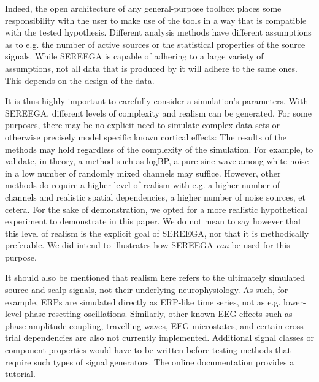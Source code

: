 Indeed, the open architecture of any general-purpose toolbox places some responsibility with the user to make use of the tools in a way that is compatible with the tested hypothesis. Different analysis methods have different assumptions as to e.g. the number of active sources or the statistical properties of the source signals. While SEREEGA is capable of adhering to a large variety of assumptions, not all data that is produced by it will adhere to the same ones. This depends on the design of the data.

It is thus highly important to carefully consider a simulation's parameters. With SEREEGA, different levels of complexity and realism can be generated. For some purposes, there may be no explicit need to simulate complex data sets or otherwise precisely model specific known cortical effects: The results of the methods may hold regardless of the complexity of the simulation. For example, to validate, in theory, a method such as logBP, a pure sine wave among white noise in a low number of randomly mixed channels may suffice. However, other methods do require a higher level of realism with e.g. a higher number of channels and realistic spatial dependencies, a higher number of noise sources, et cetera. For the sake of demonstration, we opted for a more realistic hypothetical experiment to demonstrate in this paper. We do not mean to say however that this level of realism is the explicit goal of SEREEGA, nor that it is methodically preferable. We did intend to illustrates how SEREEGA \emph{can} be used for this purpose. 

It should also be mentioned that realism here refers to the ultimately simulated source and scalp signals, not their underlying neurophysiology. As such, for example, ERPs are simulated directly as ERP-like time series, not as e.g. lower-level phase-resetting oscillations. Similarly, other known EEG effects such as phase-amplitude coupling, travelling waves, EEG microstates, and certain cross-trial dependencies are also not currently implemented. Additional signal classes or component properties would have to be written before testing methods that require such types of signal generators. The online documentation provides a tutorial.

